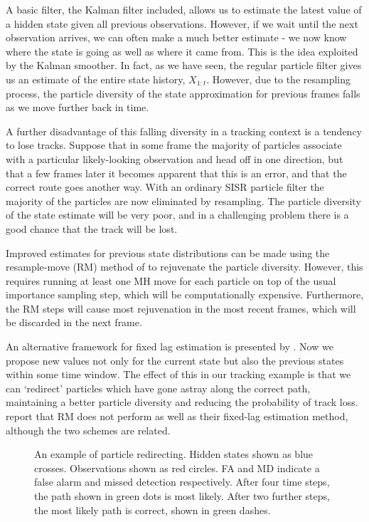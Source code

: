 A basic filter, the Kalman filter included, allows us to estimate the latest value of a hidden state given all previous observations. However, if we wait until the next observation arrives, we can often make a much better estimate - we now know where the state is going as well as where it came from. This is the idea exploited by the Kalman smoother. In fact, as we have seen, the regular particle filter gives us an estimate of the entire state history, $X_{1:t}$. However, due to the resampling process, the particle diversity of the state approximation for previous frames falls as we move further back in time.

A further disadvantage of this falling diversity in a tracking context is a tendency to lose tracks. Suppose that in some frame the majority of particles associate with a particular likely-looking observation and head off in one direction, but that a few frames later it becomes apparent that this is an error, and that the correct route goes another way. With an ordinary SISR particle filter the majority of the particles are now eliminated by resampling. The particle diversity of the state estimate will be very poor, and in a challenging problem there is a good chance that the track will be lost.

Improved estimates for previous state distributions can be made using the resample-move (RM) method of \cite{Gilks2001} to rejuvenate the particle diversity. However, this requires running at least one MH move for each particle on top of the usual importance sampling step, which will be computationally expensive. Furthermore, the RM steps will cause most rejuvenation in the most recent frames, which will be discarded in the next frame.

An alternative framework for fixed lag estimation is presented by \cite{Doucet2006}. Now we propose new values not only for the current state but also the previous states within some time window. The effect of this in our tracking example is that we can `redirect' particles which have gone astray along the correct path, maintaining a better particle diversity and reducing the probability of track loss. \cite{Doucet2006} report that RM does not perform as well as their fixed-lag estimation method, although the two schemes are related.

\begin{figure} \centering
%
\caption{An example of particle redirecting. Hidden states shown as blue crosses. Observations shown as red circles. FA and MD indicate a false alarm and missed detection respectively. After four time steps, the path shown in green dots is most likely. After two further steps, the most likely path is correct, shown in green dashes.}
\label{fig:Rerouting}%
\end{figure}
